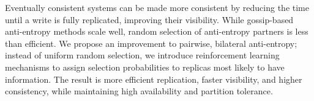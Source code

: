 Eventually consistent systems can be made more consistent by reducing the time
until a write is fully replicated, improving their visibility.
While gossip-based anti-entropy methods scale well, random selection of
anti-entropy partners is less than efficient.
We propose an improvement to pairwise, bilateral anti-entropy; instead
of uniform random selection, we introduce reinforcement learning mechanisms
to assign selection probabilities to replicas most likely to have
information.
The result is more efficient replication, faster visibility, and higher
consistency, while maintaining high availability and partition tolerance.
